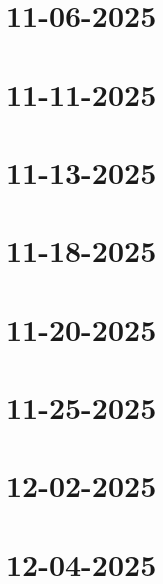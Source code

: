 \documentclass[]{mangos-musings}
\begin{document}
\newpage
\section{11-06-2025}

\newpage
\section{11-11-2025}

\newpage
\section{11-13-2025}

\newpage
\section{11-18-2025}

\newpage
\section{11-20-2025}

\newpage
\section{11-25-2025}

\newpage
\section{12-02-2025}

\newpage
\section{12-04-2025}
\end{document}
